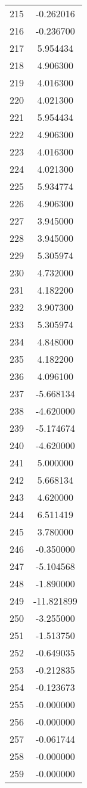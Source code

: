 \documentclass[12pt]{article}
\begin{document}
\begin{longtable}{@{}cc@{}}
215 & -0.262016 \\
216 & -0.236700 \\
217 & 5.954434 \\
218 & 4.906300 \\
219 & 4.016300 \\
220 & 4.021300 \\
221 & 5.954434 \\
222 & 4.906300 \\
223 & 4.016300 \\
224 & 4.021300 \\
225 & 5.934774 \\
226 & 4.906300 \\
227 & 3.945000 \\
228 & 3.945000 \\
229 & 5.305974 \\
230 & 4.732000 \\
231 & 4.182200 \\
232 & 3.907300 \\
233 & 5.305974 \\
234 & 4.848000 \\
235 & 4.182200 \\
236 & 4.096100 \\
237 & -5.668134 \\
238 & -4.620000 \\
239 & -5.174674 \\
240 & -4.620000 \\
241 & 5.000000 \\
242 & 5.668134 \\
243 & 4.620000 \\
244 & 6.511419 \\
245 & 3.780000 \\
246 & -0.350000 \\
247 & -5.104568 \\
248 & -1.890000 \\
249 & -11.821899 \\
250 & -3.255000 \\
251 & -1.513750 \\
252 & -0.649035 \\
253 & -0.212835 \\
254 & -0.123673 \\
255 & -0.000000 \\
256 & -0.000000 \\
257 & -0.061744 \\
258 & -0.000000 \\
259 & -0.000000 \\

\end{longtable}
\end{document}
